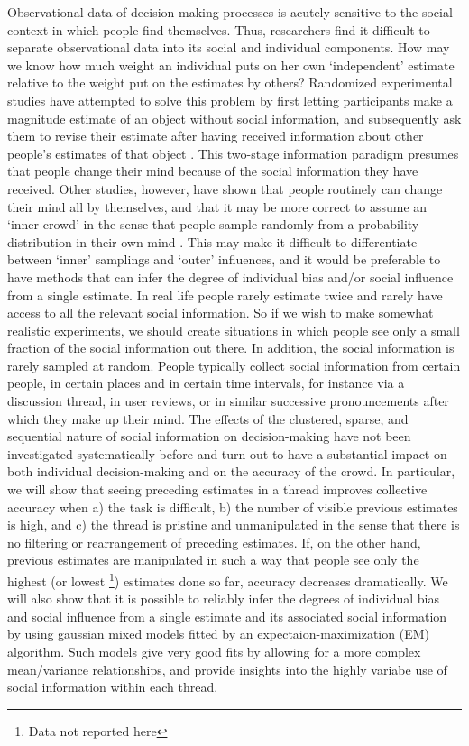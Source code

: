 \documentclass[10pt,a4paper,twocolumn,lineno]{article}
\begin{document}
Observational data of decision-making processes is acutely sensitive to the social context in which people find themselves. Thus, researchers find it difficult to separate observational data into its social and individual components. How may we know how much weight an individual puts on her own ‘independent’ estimate relative to the weight put on the estimates by others? Randomized experimental studies have attempted to solve this problem by first letting participants make a magnitude estimate of an object without social information, and subsequently ask them to revise their estimate after having received information about other people’s estimates of that object \cite{becker2017network, jayles2017social, lorenz2011social, sniezek1995cueing, mavrodiev2013quantifying}. This two-stage information paradigm presumes that people change their mind because of the social information they have received. Other studies, however, have shown that people routinely can change their mind all by themselves, and that it may be more correct to assume an `inner crowd' in the sense that people sample randomly from a probability distribution in their own mind \cite{vul2008measuring, herzog2009wisdom, herzog2014harnessing}. This may make it difficult to differentiate between `inner' samplings and `outer' influences, and it would be preferable to have methods that can infer the degree of individual bias and/or social influence from a single estimate. In real life people rarely estimate twice and rarely have access to all the relevant social information. So if we wish to make somewhat realistic experiments, we should create situations in which people see only a small fraction of the social information out there. In addition, the social information is rarely sampled at random. People typically collect social information from certain people, in certain places and in certain time intervals, for instance via a discussion thread, in user reviews, or in similar successive pronouncements after which they make up their mind. The effects of the clustered, sparse, and sequential nature of social information on decision-making have not been investigated systematically before and turn out to have a substantial impact on both individual decision-making and on the accuracy of the crowd. In particular, we will show that seeing preceding estimates in a thread improves collective accuracy when a) the task is difficult, b) the number of visible previous estimates is high, and c) the thread is pristine and unmanipulated in the sense that there is no filtering or rearrangement of preceding estimates. If, on the other hand, previous estimates are manipulated in such a way that people see only the highest (or lowest \footnote{Data not reported here}) estimates done so far, accuracy decreases dramatically. We will also show that it is possible to reliably infer the degrees of individual bias and social influence from a single estimate and its associated social information by using gaussian mixed models fitted by an expectaion-maximization (EM) algorithm. Such models give very good fits by allowing for a more complex mean/variance relationships, and provide insights into the highly variabe use of social information within each thread.
	
\end{document}
